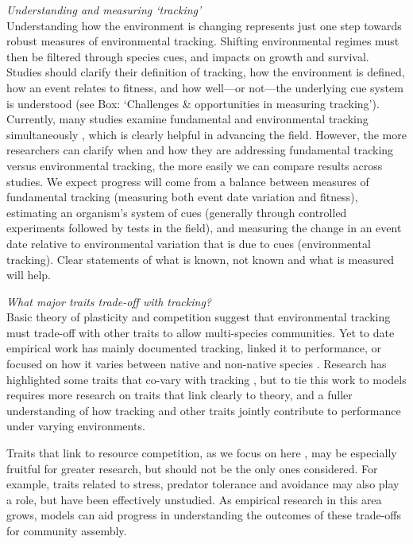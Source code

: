 \documentclass[11pt,letterpaper]{article}
\newcommand{\R}[1]{\label{}\linelabel{#1}} %
\begin{document}
\emph{Understanding and measuring `tracking'} \\
Understanding how the environment is changing represents just one step towards robust measures of environmental tracking. Shifting environmental regimes must then be filtered through species cues, and impacts on growth and survival. Studies should clarify their definition of tracking, how the environment is defined, how an event relates to fitness, and how well---or not---the underlying cue system is understood (see Box: `Challenges \& opportunities in measuring tracking'). Currently, many studies examine fundamental and environmental tracking simultaneously \R{r3misc6}\citep[e.g.,][]{visser2006,charm2008,Cleland:2012,yang2020}, which is clearly helpful in advancing the field. However, the more researchers can clarify when and how they are addressing fundamental tracking versus environmental tracking, the more easily we can compare results across studies. We expect progress will come from a balance between measures of fundamental tracking (measuring both event date variation and fitness), estimating an organism's system of cues (generally through controlled experiments followed by tests in the field), and measuring the change in an event date relative to environmental variation that is due to cues (environmental tracking). \R{r4miscvague}Clear statements of what is known, not known and what is measured will help.

\emph{What major traits trade-off with tracking?} \\ 
Basic theory of plasticity and competition suggest that environmental tracking must trade-off with other traits to allow multi-species communities. Yet to date empirical work has mainly documented tracking, linked it to performance, or focused on how it varies between native and non-native species \citep{Willis:2010al,wolkovichAmBot2013,Zettlemoyer2019}. Research has highlighted some traits that co-vary with tracking \citep[e.g.,][]{kharouba2014,lasky2016,Zhu2016BioLetters}, but to tie this work to models requires more research on traits that link clearly to theory, and a fuller understanding of how tracking and other traits jointly contribute to performance under varying environments. 

Traits that link to resource competition, as we focus on here \citep[as others have as well, see][]{volkerass}, may be especially fruitful for greater research, but should not be the only ones considered. For example, traits related to stress\R{stressagain}, predator tolerance and avoidance may also play a role, but have been effectively unstudied.  As empirical research in this area grows, models can aid progress in understanding the outcomes of these trade-offs for community assembly. \\ 
\end{document}
